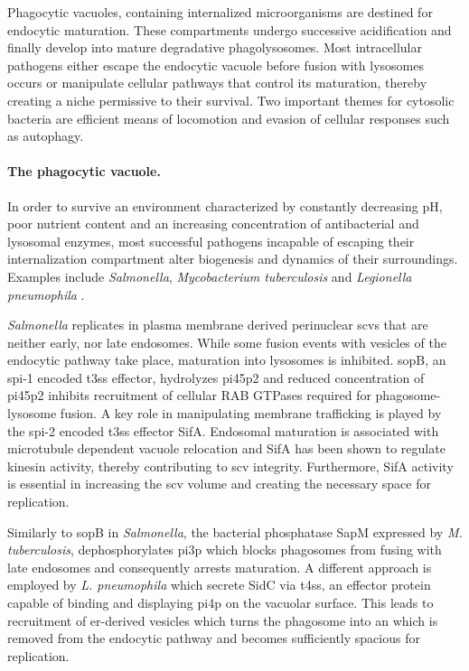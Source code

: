 Phagocytic vacuoles, containing internalized microorganisms are destined for endocytic maturation. These compartments undergo successive acidification and finally develop into mature degradative phagolysosomes. Most intracellular pathogens either escape the endocytic vacuole before fusion with lysosomes occurs or manipulate cellular pathways that control its maturation, thereby creating a niche permissive to their survival. Two important themes for cytosolic bacteria are efficient means of locomotion and evasion of cellular responses such as autophagy.

\paragraph{The phagocytic vacuole.}
In order to survive an environment characterized by constantly decreasing pH, poor nutrient content and an increasing concentration of antibacterial and lysosomal enzymes, most successful pathogens incapable of escaping their internalization compartment alter biogenesis and dynamics of their surroundings. Examples include \textit{Salmonella}, \textit{Mycobacterium tuberculosis} and \textit{Legionella pneumophila} \citep{Ham2011}.

\textit{Salmonella} replicates in plasma membrane derived perinuclear \glspl{scv} that are neither early, nor late endosomes. While some fusion events with vesicles of the endocytic pathway take place, maturation into lysosomes is inhibited. \Acrshort{sop}B, an \acrshort{spi}-1 encoded \gls{t3ss} effector, hydrolyzes \gls{pi45p2} and reduced concentration of \gls{pi45p2} inhibits recruitment of cellular RAB GTPases required for phagosome-lysosome fusion. A key role in manipulating membrane trafficking is played by the \acrshort{spi}-2 encoded \gls{t3ss} effector SifA. Endosomal maturation is associated with microtubule dependent vacuole relocation and SifA has been shown to regulate kinesin activity, thereby contributing to \gls{scv} integrity. Furthermore, SifA activity is essential in increasing the \gls{scv} volume and creating the necessary space for replication.

Similarly to \Acrshort{sop}B in \textit{Salmonella}, the bacterial phosphatase SapM expressed by \textit{M. tuberculosis}, dephosphorylates \gls{pi3p} which blocks phagosomes from fusing with late endosomes and consequently arrests maturation. A different approach is employed by \textit{L. pneumophila} which secrete SidC via \gls{t4ss}, an effector protein capable of binding and displaying \gls{pi4p} on the vacuolar surface. This leads to recruitment of \acrshort{er}-derived vesicles which turns the phagosome into an  which is removed from the endocytic pathway and becomes sufficiently spacious for replication.

